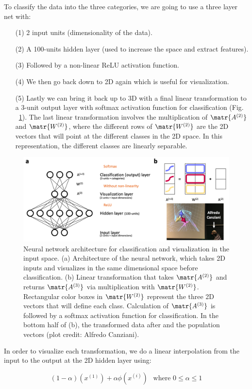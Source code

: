 \noindent
To classify the data into the three categories, we are going to use a three layer net with: 
\begin{itemize}
\item[(1)] 2 input units (dimensionality of the data).
\item[(2)] A 100-units hidden layer (used to increase the space and extract features).
\item[(3)] Followed by a non-linear ReLU activation function. 
\item[(4)] We then go back down to 2D again which is useful for visualization.
\item[(5)] Lastly we can bring it back up to 3D with a final linear transformation to a 3-unit output layer with softmax activation function for classification 
(Fig. ~\ref{fig:ArchitectureForClassificationAndVisualizationInTheInputSpace}). 
The last linear transformation involves the multiplication of $\matr{A^{(2)}}$ and $\matr{W^{(2)}}$, 
where the different rows of $\matr{W^{(2)}}$ are the 2D vectors that will point at the different classes in the 2D space. 
In this representation, the different classes are linearly separable.
\end{itemize}

\begin{figure}[!h]
\centering
\includegraphics[width=170mm]{lectures/04-a/images/ArchitectureForClassificationAndVisualizationInTheInputSpace.png}
\caption{Neural network architecture for classification and visualization in the input space. (a) Architecture of the neural network, which takes 2D inputs and visualizes in the same dimensional space before classification. (b) Linear transformation that takes $\matr{A^{(2)}}$ and returns $\matr{A^{(3)}}$ via multiplication with $\matr{W^{(2)}}$. Rectangular color boxes in $\matr{W^{(2)}}$ represent the three 2D vectors that will define each class. Calculation of $\matr{A^{(3)}}$ is followed by a softmax activation function for classification. In the bottom half of (b), the transformed data after and the population vectors (plot credit: Alfredo Canziani).}
\label{fig:ArchitectureForClassificationAndVisualizationInTheInputSpace}
\end{figure}

\noindent

In order to visualize each transformation, we do a linear interpolation from the input to the output at the 2D hidden layer using:

\[
(1-\alpha)(x^{(1)}) + \alpha \phi (x^{(i)}) ~~\text{ where } 0 \leq \alpha \leq 1
\]
